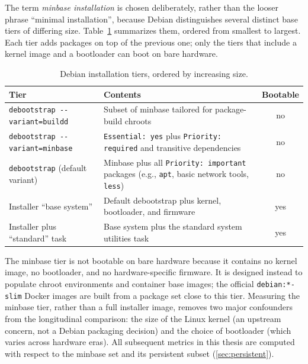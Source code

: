 The term \emph{minbase installation} is chosen deliberately, rather than the looser phrase ``minimal installation'', because Debian distinguishes several distinct base tiers of differing size. Table~\ref{tab:install-tiers} summarizes them, ordered from smallest to largest. Each tier adds packages on top of the previous one; only the tiers that include a kernel image and a bootloader can boot on bare hardware.

\begin{table}[ht]
  \centering
  \caption{Debian installation tiers, ordered by increasing size.} 
  \label{tab:install-tiers}
  \footnotesize
  \begin{tabular}{p{}p{}c}
    \hline
    Tier & Contents & Bootable  \\
    \hline
    \texttt{debootstrap -{}-variant=buildd}    & Subset of minbase tailored for package-build chroots & no \\
    \hline
    \texttt{debootstrap -{}-variant=minbase}   & \texttt{Essential: yes} plus \texttt{Priority: required} and transitive dependencies & no \\
    \hline
    \texttt{debootstrap} (default variant)     & Minbase plus all \texttt{Priority: important} packages (e.g., \texttt{apt}, basic network tools, \texttt{less}) & no \\
    \hline
    Installer ``base system''                  & Default debootstrap plus kernel, bootloader, and firmware & yes \\
    \hline
    Installer plus ``standard'' task           & Base system plus the standard system utilities task & yes \\
    \hline
  \end{tabular}
\end{table}

The minbase tier is not bootable on bare hardware because it contains no kernel image, no bootloader, and no hardware-specific firmware. It is designed instead to populate chroot environments and container base images; the official \texttt{debian:*-slim} Docker images are built from a package set close to this tier. Measuring the minbase tier, rather than a full installer image, removes two major confounders from the longitudinal comparison: the size of the Linux kernel (an upstream concern, not a Debian packaging decision) and the choice of bootloader (which varies across hardware eras). All subsequent metrics in this thesis are computed with respect to the minbase set and its persistent subset (\autoref{sec:persistent}).

